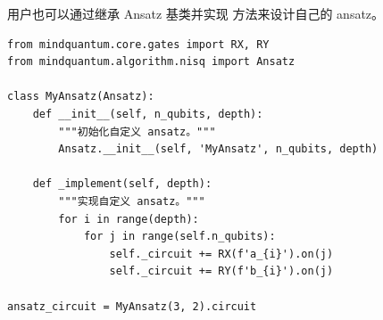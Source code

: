 用户也可以通过继承 Ansatz 基类并实现  方法来设计自己的 ansatz。

\begin{lstlisting}
from mindquantum.core.gates import RX, RY
from mindquantum.algorithm.nisq import Ansatz

class MyAnsatz(Ansatz):
    def __init__(self, n_qubits, depth):
        """初始化自定义 ansatz。"""
        Ansatz.__init__(self, 'MyAnsatz', n_qubits, depth)

    def _implement(self, depth):
        """实现自定义 ansatz。"""
        for i in range(depth):
            for j in range(self.n_qubits):
                self._circuit += RX(f'a_{i}').on(j)
                self._circuit += RY(f'b_{i}').on(j)

ansatz_circuit = MyAnsatz(3, 2).circuit
\end{lstlisting}

